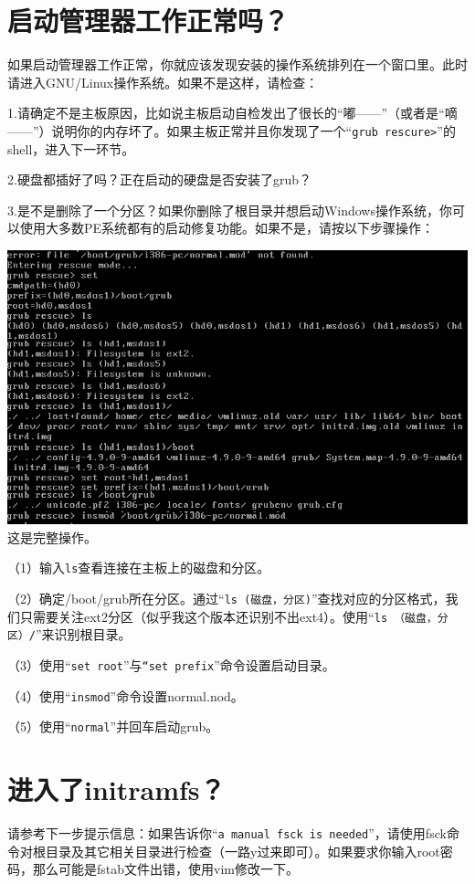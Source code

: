 \section{启动管理器工作正常吗？}
如果启动管理器工作正常，你就应该发现安装的操作系统排列在一个窗口里。此时请进入GNU/Linux操作系统。如果不是这样，请检查：\par
1.请确定不是主板原因，比如说主板启动自检发出了很长的“嘟——”（或者是“嘀——”）说明你的内存坏了。如果主板正常并且你发现了一个“\verb|grub rescure>|”的shell，进入下一环节。\par
2.硬盘都插好了吗？正在启动的硬盘是否安装了grub？\par
3.是不是删除了一个分区？如果你删除了根目录并想启动Windows操作系统，你可以使用大多数PE系统都有的启动修复功能。如果不是，请按以下步骤操作：
\begin{center}
	\includegraphics{pic/grubrescure}\\
	这是完整操作。
\end{center} \par
（1）输入\verb|ls|查看连接在主板上的磁盘和分区。\par
（2）确定/boot/grub所在分区。通过“\verb|ls (磁盘，分区)|”查找对应的分区格式，我们只需要关注ext2分区（似乎我这个版本还识别不出ext4）。使用“\verb|ls （磁盘，分区）/|”来识别根目录。\par
（3）使用“\verb|set root|”与\verb|“set prefix|”命令设置启动目录。\par
（4）使用“\verb|insmod|”命令设置normal.nod。\par
（5）使用“\verb|normal|”并回车启动grub。
\section{进入了initramfs？}
请参考下一步提示信息：如果告诉你“\verb|a manual fsck is needed|”，请使用fsck命令对根目录及其它相关目录进行检查（一路y过来即可）。如果要求你输入root密码，那么可能是fstab文件出错，使用vim修改一下。
